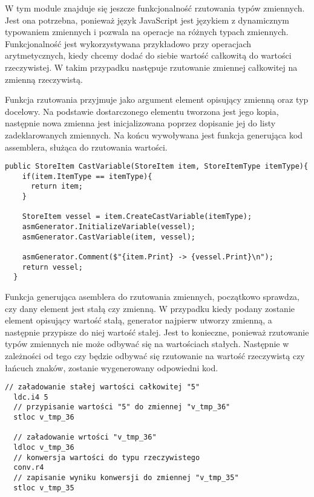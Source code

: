 \par W tym module znajduje się jeszcze funkcjonalność rzutowania typów zmiennych. Jest ona potrzebna, ponieważ język JavaScript jest językiem z dynamicznym typowaniem zmiennych i pozwala na operacje na różnych typach zmiennych. Funkcjonalność jest wykorzystywana przykładowo przy operacjach arytmetycznych, kiedy chcemy dodać do siebie wartość całkowitą do wartości rzeczywistej. W takim przypadku następuje rzutowanie zmiennej całkowitej na zmienną rzeczywistą.
\par Funkcja rzutowania przyjmuje jako argument element opisujący zmienną oraz typ docelowy. Na podstawie dostarczonego elementu tworzona jest jego kopia, następnie nowa zmienna jest inicjalizowana poprzez dopisanie jej do listy zadeklarowanych zmiennych. Na końcu wywoływana jest funkcja generująca kod assemblera, służąca do rzutowania wartości.

\begin{lstlisting}[language=CSharp, caption=Implementacja funkcji rzutującej zmienne, label=alg:variable2]
  public StoreItem CastVariable(StoreItem item, StoreItemType itemType){
    if(item.ItemType == itemType){
      return item;
    }

    StoreItem vessel = item.CreateCastVariable(itemType);
    asmGenerator.InitializeVariable(vessel);
    asmGenerator.CastVariable(item, vessel);

    asmGenerator.Comment($"{item.Print} -> {vessel.Print}\n");
    return vessel;
  }
\end{lstlisting}

\par Funkcja generująca asemblera do rzutowania zmiennych, początkowo sprawdza, czy dany element jest stałą czy zmienną. W przypadku kiedy podany zostanie element opisujący wartość stałą, generator najpierw utworzy zmienną, a następnie przypisze do niej wartość stałej. Jest to konieczne, ponieważ rzutowanie typów zmiennych nie może odbywać się na wartościach stałych. Następnie w zależności od tego czy będzie odbywać się rzutowanie na wartość rzeczywistą czy łańcuch znaków, zostanie wygenerowany odpowiedni kod.

\begin{lstlisting}[language=IL, caption=Kod assemblera rzutowania wrtości całkowitej na wartość rzeczywistą, label=alg:variable3]
  // załadowanie stałej wartości całkowitej "5"
  ldc.i4 5
  // przypisanie wartości "5" do zmiennej "v_tmp_36"
  stloc v_tmp_36

  // załadowanie wrtości "v_tmp_36"
  ldloc v_tmp_36
  // konwersja wartości do typu rzeczywistego
  conv.r4
  // zapisanie wyniku konwersji do zmiennej "v_tmp_35"
  stloc v_tmp_35
\end{lstlisting}

